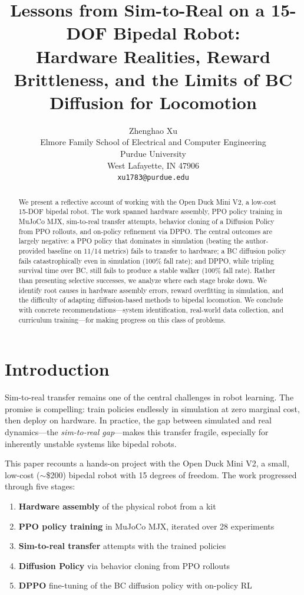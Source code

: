 \documentclass{article}
\title{Lessons from Sim-to-Real on a 15-DOF Bipedal Robot:\\Hardware Realities, Reward Brittleness, and the Limits of BC Diffusion for Locomotion}
\author{%
  Zhenghao Xu\\
  Elmore Family School of Electrical and Computer Engineering\\
  Purdue University\\
  West Lafayette, IN 47906 \\
  \texttt{xu1783@purdue.edu} \\
}
\begin{document}
\maketitle

\begin{abstract}
We present a reflective account of working with the Open Duck Mini V2, a low-cost 15-DOF bipedal robot. The work spanned hardware assembly, PPO policy training in MuJoCo MJX, sim-to-real transfer attempts, behavior cloning of a Diffusion Policy from PPO rollouts, and on-policy refinement via DPPO. The central outcomes are largely negative: a PPO policy that dominates in simulation (beating the author-provided baseline on 11/14 metrics) fails to transfer to hardware; a BC diffusion policy fails catastrophically even in simulation (100\% fall rate); and DPPO, while tripling survival time over BC, still fails to produce a stable walker (100\% fall rate). Rather than presenting selective successes, we analyze where each stage broke down. We identify root causes in hardware assembly errors, reward overfitting in simulation, and the difficulty of adapting diffusion-based methods to bipedal locomotion. We conclude with concrete recommendations---system identification, real-world data collection, and curriculum training---for making progress on this class of problems.
\end{abstract}


\section{Introduction}

Sim-to-real transfer remains one of the central challenges in robot learning. The promise is compelling: train policies endlessly in simulation at zero marginal cost, then deploy on hardware. In practice, the gap between simulated and real dynamics---the \emph{sim-to-real gap}---makes this transfer fragile, especially for inherently unstable systems like bipedal robots.

This paper recounts a hands-on project with the Open Duck Mini V2, a small, low-cost ($\sim$\$200) bipedal robot with 15 degrees of freedom. The work progressed through five stages:

\begin{enumerate}[nosep]
  \item \textbf{Hardware assembly} of the physical robot from a kit
  \item \textbf{PPO policy training} in MuJoCo MJX, iterated over 28 experiments
  \item \textbf{Sim-to-real transfer} attempts with the trained policies
  \item \textbf{Diffusion Policy} via behavior cloning from PPO rollouts
  \item \textbf{DPPO} fine-tuning of the BC diffusion policy with on-policy RL
\end{enumerate}
\end{document}
